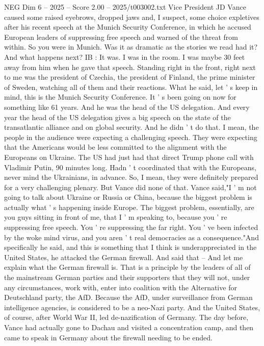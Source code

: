 \begin{textsample}{NEG Dim 6 – 2025 – Score 2.00 – 2025/t003002.txt}
Vice President JD Vance caused some raised eyebrows, dropped jaws and, I suspect, some choice expletives after his recent speech at the Munich Security Conference, in which he accused European leaders of suppressing free speech and warned of the threat from within.
So you were in Munich.
Was it as dramatic as the stories we read had it?
And what happens next?
IB : It was.
I was in the room.
I was maybe 30 feet away from him when he gave that speech.
Standing right in the front, right next to me was the president of Czechia, the president of Finland, the prime minister of Sweden, watching all of them and their reactions.
What he said, let ' s keep in mind, this is the Munich Security Conference.
It ' s been going on now for something like 61 years.
And he was the head of the US delegation.
And every year the head of the US delegation gives a big speech on the state of the transatlantic alliance and on global security.
And he didn ' t do that.
I mean, the people in the audience were expecting a challenging speech.
They were expecting that the Americans would be less committed to the alignment with the Europeans on Ukraine.
The US had just had that direct Trump phone call with Vladimir Putin, 90 minutes long.
Hadn ' t coordinated that with the Europeans, never mind the Ukrainians, in advance.
So, I mean, they were definitely prepared for a very challenging plenary.
But Vance did none of that.
Vance said,"I ' m not going to talk about Ukraine or Russia or China, because the biggest problem is actually what ' s happening inside Europe.
The biggest problem, essentially, are you guys sitting in front of me, that I ' m speaking to, because you ' re suppressing free speech.
You ' re suppressing the far right.
You ' ve been infected by the woke mind virus, and you aren ' t real democracies as a consequence."And specifically he said, and this is something that I think is underappreciated in the United States, he attacked the German firewall.
And said that -- And let me explain what the German firewall is.
That is a principle by the leaders of all of the mainstream German parties and their supporters that they will not, under any circumstances, work with, enter into coalition with the Alternative for Deutschland party, the AfD.
Because the AfD, under surveillance from German intelligence agencies, is considered to be a neo-Nazi party.
And the United States, of course, after World War II, led de-nazification of Germany.
The day before, Vance had actually gone to Dachau and visited a concentration camp, and then came to speak in Germany about the firewall needing to be ended.

\end{textsample}
